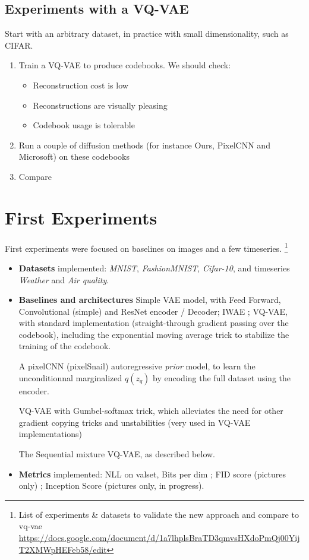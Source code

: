 \documentclass{article}
\begin{document}
\subsection{Experiments with a VQ-VAE}

Start with an arbitrary dataset, in practice with small dimensionality, such as CIFAR.
\begin{enumerate}
	\item Train a VQ-VAE to produce codebooks. We should check:
		\begin{itemize}
			\item Reconstruction cost is low
			\item Reconstructions are visually pleasing
			\item Codebook usage is tolerable
		\end{itemize}
	\item Run a couple of diffusion methods (for instance Ours, PixelCNN and Microsoft) on these codebooks
	\item Compare
\end{enumerate}








\clearpage
\newpage

\section{First Experiments}
First experiments were focused on baselines on images and a few timeseries. \footnote{List of experiments \& datasets to validate the new approach and compare to vq-vae \url{https://docs.google.com/document/d/1a7lhplsBraTD3qmvsHXdoPmQj00YijT2XMWpHEFeb58/edit}}

\begin{itemize}
	\item \textbf{Datasets} implemented: {\em MNIST}, {\em FashionMNIST}, {\em Cifar-10}, and timeseries {\em Weather} and {\em Air quality}.
	\item \textbf{Baselines and architectures} Simple VAE model, with Feed Forward, Convolutional (simple) and ResNet encoder / Decoder; IWAE ; VQ-VAE, with standard implementation (straight-through gradient passing over the codebook), including the exponential moving average trick to stabilize the training of the codebook.

	A pixelCNN (pixelSnail) autoregressive \textit{prior} model, to learn the unconditionnal marginalized $q(z_q)$ by encoding the full dataset using the encoder.

	VQ-VAE with Gumbel-softmax trick, which alleviates the need for other gradient copying tricks and unstabilities (very used in VQ-VAE implementations)

	The Sequential mixture VQ-VAE, as described below.
  \item \textbf{Metrics} implemented: NLL on valset, Bits per dim ; FID score (pictures only) ; Inception Score (pictures only, in progress).
\end{itemize}
\end{document}
